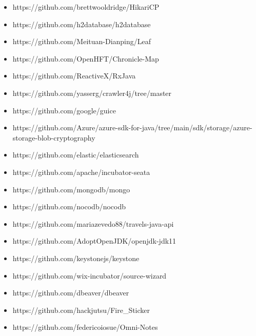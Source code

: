 \documentclass[
]{VUMIFPSbakalaurinis}
\begin{document}
%

\begin{itemize}
    \item https://github.com/brettwooldridge/HikariCP
    \item https://github.com/h2database/h2database
    \item https://github.com/Meituan-Dianping/Leaf
    \item https://github.com/OpenHFT/Chronicle-Map
    \item https://github.com/ReactiveX/RxJava
    \item https://github.com/yasserg/crawler4j/tree/master
    \item https://github.com/google/guice
    \item https://github.com/Azure/azure-sdk-for-java/tree/main/sdk/storage/azure-storage-blob-cryptography
    \item https://github.com/elastic/elasticsearch
    \item https://github.com/apache/incubator-seata
    \item https://github.com/mongodb/mongo
    \item https://github.com/nocodb/nocodb
    \item https://github.com/mariazevedo88/travels-java-api
    \item https://github.com/AdoptOpenJDK/openjdk-jdk11
    \item https://github.com/keystonejs/keystone
    \item https://github.com/wix-incubator/source-wizard
    \item https://github.com/dbeaver/dbeaver
    \item https://github.com/hackjutsu/Fire\_Sticker
    \item https://github.com/federicoiosue/Omni-Notes
\end{itemize}
\end{document}
